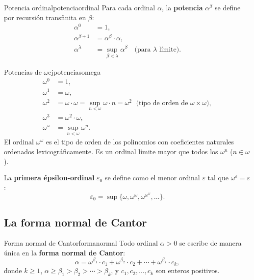 \begin{definicion}{Potencia ordinal}{potenciaordinal}
Para cada ordinal $\alpha$, la \textbf{potencia} $\alpha^\beta$ se define por recursión transfinita en $\beta$:
\begin{align*}
  \alpha^0 &= 1,\\
  \alpha^{\beta+1} &= \alpha^\beta \cdot \alpha,\\
  \alpha^\lambda &= \sup_{\beta < \lambda} \alpha^\beta \quad\text{(para } \lambda \text{ límite)}.
\end{align*}
\end{definicion}

\begin{ejemplo}{Potencias de $\omega$}{ejpotenciasomega}
\begin{align*}
  \omega^0 &= 1,\\
  \omega^1 &= \omega,\\
  \omega^2 &= \omega \cdot \omega = \sup_{n < \omega} \omega \cdot n = \omega^2\;\text{ (tipo de orden de } \omega \times \omega\text{)},\\
  \omega^3 &= \omega^2 \cdot \omega,\\
  \omega^\omega &= \sup_{n < \omega} \omega^n.
\end{align*}
El ordinal $\omega^\omega$ es el tipo de orden de los polinomios con coeficientes naturales ordenados lexicográficamente. Es un ordinal límite mayor que todos los $\omega^n$ ($n \in \omega$).

La \textbf{primera épsilon-ordinal} $\varepsilon_0$ se define como el menor ordinal $\varepsilon$ tal que $\omega^\varepsilon = \varepsilon$:
\[
  \varepsilon_0 = \sup\bigl\{\omega, \omega^\omega, \omega^{\omega^\omega}, \ldots\bigr\}.
\]
\end{ejemplo}

\subsection{La forma normal de Cantor}

\begin{teorema}{Forma normal de Cantor}{formanormal}
Todo ordinal $\alpha > 0$ se escribe de manera única en la \textbf{forma normal de Cantor}:
\[
  \alpha = \omega^{\beta_1} \cdot c_1 + \omega^{\beta_2} \cdot c_2 + \cdots + \omega^{\beta_k} \cdot c_k,
\]
donde $k \geq 1$, $\alpha \geq \beta_1 > \beta_2 > \cdots > \beta_k$, y $c_1, c_2, \ldots, c_k$ son enteros positivos.
\end{teorema}

